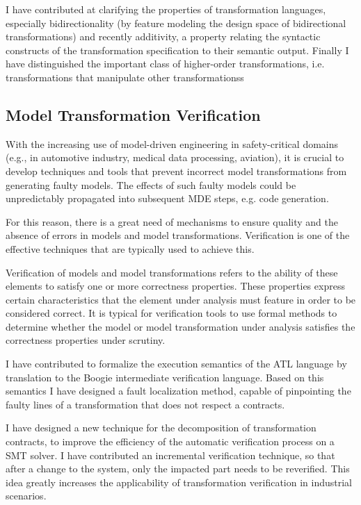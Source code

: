 I have contributed at clarifying the properties of transformation languages, especially bidirectionality (by feature modeling the design space of bidirectional transformations) and recently additivity, a property relating the syntactic constructs of the transformation specification to their semantic output.  
Finally I have distinguished the important class of higher-order transformations, i.e. transformations that manipulate other transformationss

\subsection*{Model Transformation Verification}

With the increasing use of model-driven engineering in safety-critical domains (e.g., in automotive industry, medical data processing, aviation), it is crucial to develop techniques and tools that prevent incorrect model transformations from generating faulty models. The effects of such faulty models could be unpredictably propagated into subsequent MDE steps, e.g. code generation.

For this reason, there is a great need of mechanisms to ensure quality and the absence of errors in models and model transformations. Verification is one of the effective techniques that are typically used to achieve this.

Verification of models and model transformations refers to the ability of these elements to satisfy one or more correctness properties. These properties express certain characteristics that the element under analysis must feature in order to be considered correct. It is typical for verification tools to use formal methods to determine whether the model or model transformation under analysis satisfies the correctness properties under scrutiny.

I have contributed to formalize the execution semantics of the ATL language by translation to the Boogie intermediate verification language. Based on this semantics I have designed a fault localization method, capable of pinpointing the faulty lines of a transformation that does not respect a contracts.

I have designed a new technique for the decomposition of transformation contracts, to improve the efficiency of the automatic verification process on a SMT solver. I have contributed an incremental verification technique, so that after a change to the system, only the impacted part needs to be reverified. This idea greatly increases the applicability of transformation verification in industrial scenarios. 

